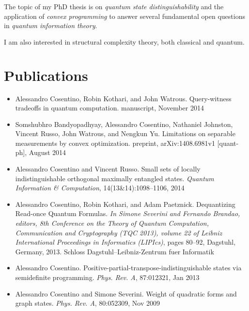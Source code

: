 \documentclass[]{article}
\begin{document}
The topic of my PhD thesis is on \emph{quantum state distinguishability} 
and the application of 
\emph{convex programming} to answer several fundamental open questions in 
\emph{quantum information theory}.

I am also interested in structural complexity theory, both classical and 
quantum.

% 
\section{Publications}\label{publications}

\begin{itemize}
\item Alessandro Cosentino, Robin Kothari, and John Watrous. Query-witness 
tradeoffs in quantum computation. manuscript, November 2014
\item Somshubhro Bandyopadhyay, Alessandro Cosentino, Nathaniel Johnston, 
Vincent Russo, John Watrous, and Nengkun Yu. Limitations on separable 
measurements by convex optimization. preprint,
arXiv:1408.6981v1 [quant-ph], August 2014
\item Alessandro Cosentino and Vincent Russo. Small sets of locally 
indistinguishable orthogonal maximally
entangled states. \emph{Quantum Information \& Computation}, 
14(13\&14):1098–1106, 2014
\item Alessandro Cosentino, Robin Kothari, and Adam Paetznick. 
Dequantizing Read-once Quantum Formulas.
\emph{In Simone Severini and Fernando Brandao, editors, 8th Conference on the 
Theory of Quantum Computation, Communication and Cryptography (TQC 2013), 
volume 22 of Leibniz International Proceedings
in Informatics (LIPIcs)}, pages 80--92, Dagstuhl, Germany, 2013. Schloss 
Dagstuhl–Leibniz-Zentrum fuer Informatik
\item Alessandro Cosentino. Positive-partial-transpose-indistinguishable states 
via semidefinite programming.
\emph{Phys. Rev. A}, 87:012321, Jan 2013
\item Alessandro Cosentino and Simone Severini. Weight of quadratic forms and 
graph states. \emph{Phys. Rev. A}, 80:052309, Nov 2009
\end{itemize}
\end{document}

